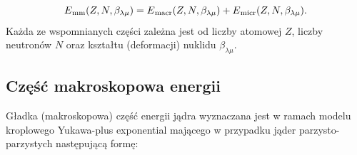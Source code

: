 \documentclass[a4paper,polish]{article}
\numberwithin{equation}{section}
\begin{document}
\begin{equation}
E\textsubscript{mm}(Z,N,\beta_{\lambda \mu}) = E\textsubscript{macr}(Z,N,\beta_{\lambda \mu}) + E\textsubscript{micr}(Z,N,\beta_{\lambda \mu}).
\end{equation}
Każda ze wspomnianych części zależna jest od liczby atomowej $Z$, liczby neutronów $N$ oraz kształtu (deformacji) nuklidu $\beta_{\lambda \mu}$.

\subsection{Część makroskopowa energii}
Gładka (makroskopowa) część energii jądra wyznaczana jest w ramach modelu kroplowego Yukawa-plus exponential \cite{Krappe} mającego w przypadku jąder parzysto-parzystych następującą formę:
\end{document}
